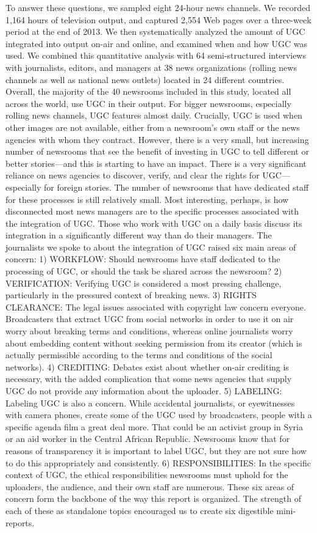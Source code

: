 \begin{enumerate}
To answer these questions, we sampled eight 24-hour news channels. We
recorded 1,164 hours of television output, and captured 2,554 Web pages
over a three-week period at the end of 2013. We then systematically analyzed
the amount of UGC integrated into output on-air and online, and examined
when and how UGC was used. We combined this quantitative analysis with
64 semi-structured interviews with journalists, editors, and managers at 38
news organizations (rolling news channels as well as national news outlets)
located in 24 different countries.
Overall, the majority of the 40 newsrooms included in this study, located
all across the world, use UGC in their output. For bigger newsrooms, especially
rolling news channels, UGC features almost daily. Crucially, UGC is
used when other images are not available, either from a newsroom's own
staff or the news agencies with whom they contract. However, there is a
very small, but increasing number of newsrooms that see the benefit of
investing in UGC to tell different or better stories—and this is starting to
have an impact.
There is a very significant reliance on news agencies to discover, verify,
and clear the rights for UGC—especially for foreign stories. The number
of newsrooms that have dedicated staff for these processes is still
relatively small.
Most interesting, perhaps, is how disconnected most news managers are to
the specific processes associated with the integration of UGC. Those who
work with UGC on a daily basis discuss its integration in a significantly different
way than do their managers.
The journalists we spoke to about the integration of UGC raised six main
areas of concern:
1) WORKFLOW: Should newsrooms have staff dedicated to
the processing of UGC, or should the task be shared across
the newsroom?
2) VERIFICATION: Verifying UGC is considered a most pressing
challenge, particularly in the pressured context of breaking news.
3) RIGHTS CLEARANCE: The legal issues associated with copyright
law concern everyone. Broadcasters that extract UGC from
social networks in order to use it on air worry about breaking
terms and conditions, whereas online journalists worry about
embedding content without seeking permission from its creator
(which is actually permissible according to the terms and conditions
of the social networks).
4) CREDITING: Debates exist about whether on-air crediting is
necessary, with the added complication that some news
agencies that supply UGC do not provide any information about
the uploader.
5) LABELING: Labeling UGC is also a concern. While accidental
journalists, or eyewitnesses with camera phones, create some
of the UGC used by broadcasters, people with a specific agenda
film a great deal more. That could be an activist group in Syria
or an aid worker in the Central African Republic. Newsrooms
know that for reasons of transparency it is important to
label UGC, but they are not sure how to do this appropriately
and consistently.
6) RESPONSIBILITIES: In the specific context of UGC, the ethical
responsibilities newsrooms must uphold for the uploaders,
the audience, and their own staff are numerous.
These six areas of concern form the backbone of the way this report is organized.
The strength of each of these as standalone topics encouraged us to
create six digestible mini-reports.


\end{enumerate}
